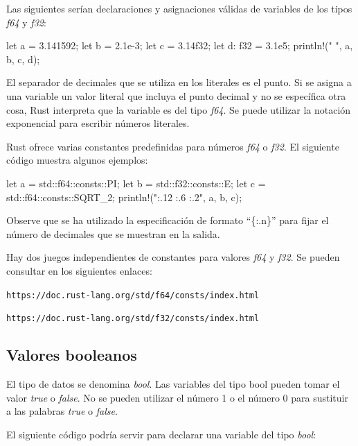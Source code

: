 Las siguientes serían declaraciones y asignaciones válidas de variables de los tipos \textit{f64} y \textit{f32}:

\vspace{0.7em}
\begin{Codigo}
let a = 3.141592;
let b = 2.1e-3;
let c = 3.14f32;
let d: f32 = 3.1e5;
println!("{} {} {} {}", a, b, c, d);
\end{Codigo}
\vspace{1em}

El separador de decimales que se utiliza en los literales es el punto. Si se asigna a una variable un valor literal que incluya el punto decimal y no se específica otra cosa, Rust interpreta que la variable es del tipo \textit{f64}. Se puede utilizar la notación exponencial para escribir números literales.

Rust ofrece varias constantes predefinidas para números \textit{f64} o \textit{f32}. El siguiente código muestra algunos ejemplos:

\vspace{0.7em}
\begin{Codigo}
let a = std::f64::consts::PI;
let b = std::f32::consts::E;
let c = std::f64::consts::SQRT_2;
println!("{:.12} {:.6} {:.2}", a, b, c);
\end{Codigo}

Observe que se ha utilizado la especificación de formato ``\{:.n\}'' para fijar el número de decimales que se muestran en la salida. 

Hay dos juegos independientes de constantes para valores \textit{f64} y \textit{f32}. Se pueden consultar en los siguientes enlaces:

{\centering \texttt{https://doc.rust-lang.org/std/f64/consts/index.html} \par}   

{\centering \texttt{https://doc.rust-lang.org/std/f32/consts/index.html} \par}   

\subsection{Valores booleanos}
El tipo de datos se denomina \textit{bool}. Las variables del tipo bool pueden tomar el valor \textit{true} o \textit{false}. No se pueden utilizar el número 1 o el número 0 para sustituir a las palabras \textit{true} o \textit{false}.

El siguiente código podría servir para declarar una variable del tipo \textit{bool}:


